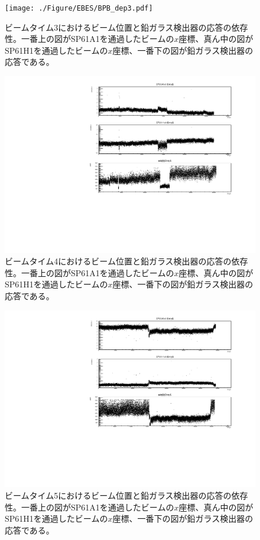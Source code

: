 \begin{figure}[H]
	\begin{center}
		\texttt{[image: ./Figure/EBES/BPB\_dep3.pdf]}
		\caption[ビームタイム3におけるビーム位置と鉛ガラス検出器の応答の依存性]{ビームタイム3におけるビーム位置と鉛ガラス検出器の応答の依存性。一番上の図がSP61A1を通過したビームの$x$座標、真ん中の図がSP61H1を通過したビームの$x$座標、一番下の図が鉛ガラス検出器の応答である。}
		\label{EBAS_Beam_dep_3}
	\end{center}
\end{figure}

\begin{figure}[H]
	\begin{center}
		\includegraphics[width=330pt]{./Figure/EBES/BPB_dep4.pdf}
		\caption[ビームタイム4におけるビーム位置と鉛ガラス検出器の応答の依存性]{ビームタイム4におけるビーム位置と鉛ガラス検出器の応答の依存性。一番上の図がSP61A1を通過したビームの$x$座標、真ん中の図がSP61H1を通過したビームの$x$座標、一番下の図が鉛ガラス検出器の応答である。}
		\label{EBAS_Beam_dep_4}
	\end{center}
\end{figure}

\begin{figure}[H]
	\begin{center}
		\includegraphics[width=330pt]{./Figure/EBES/BPB_dep5.pdf}
		\caption[ビームタイム5におけるビーム位置と鉛ガラス検出器の応答の依存性]{ビームタイム5におけるビーム位置と鉛ガラス検出器の応答の依存性。一番上の図がSP61A1を通過したビームの$x$座標、真ん中の図がSP61H1を通過したビームの$x$座標、一番下の図が鉛ガラス検出器の応答である。}
		\label{EBAS_Beam_dep_5}
	\end{center}
\end{figure}

